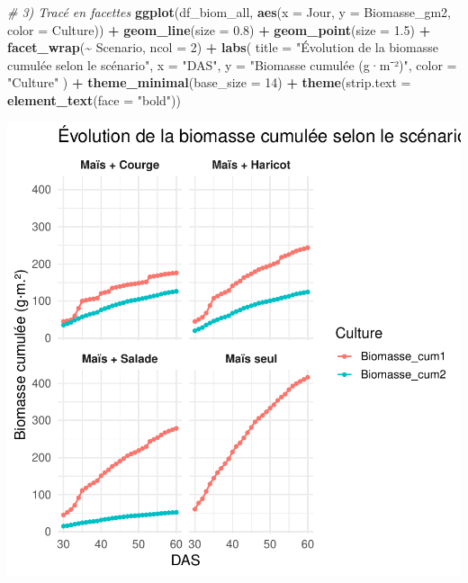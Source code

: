 \documentclass[
]{article}
\newenvironment{Shaded}{\begin{snugshade}}{\end{snugshade}}
\newcommand{\AttributeTok}[1]{\textcolor[rgb]{0.13,0.29,0.53}{#1}}
\newcommand{\CommentTok}[1]{\textcolor[rgb]{0.56,0.35,0.01}{\textit{#1}}}
\newcommand{\DecValTok}[1]{\textcolor[rgb]{0.00,0.00,0.81}{#1}}
\newcommand{\FloatTok}[1]{\textcolor[rgb]{0.00,0.00,0.81}{#1}}
\newcommand{\FunctionTok}[1]{\textcolor[rgb]{0.13,0.29,0.53}{\textbf{#1}}}
\newcommand{\NormalTok}[1]{#1}
\newcommand{\SpecialCharTok}[1]{\textcolor[rgb]{0.81,0.36,0.00}{\textbf{#1}}}
\newcommand{\StringTok}[1]{\textcolor[rgb]{0.31,0.60,0.02}{#1}}
\begin{document}
\begin{Shaded}
\begin{Highlighting}[]
\CommentTok{\# 3) Tracé en facettes}
\FunctionTok{ggplot}\NormalTok{(df\_biom\_all, }\FunctionTok{aes}\NormalTok{(}\AttributeTok{x =}\NormalTok{ Jour, }\AttributeTok{y =}\NormalTok{ Biomasse\_gm2, }\AttributeTok{color =}\NormalTok{ Culture)) }\SpecialCharTok{+}
  \FunctionTok{geom\_line}\NormalTok{(}\AttributeTok{size =} \FloatTok{0.8}\NormalTok{) }\SpecialCharTok{+}
  \FunctionTok{geom\_point}\NormalTok{(}\AttributeTok{size =} \FloatTok{1.5}\NormalTok{) }\SpecialCharTok{+}
  \FunctionTok{facet\_wrap}\NormalTok{(}\SpecialCharTok{\textasciitilde{}}\NormalTok{ Scenario, }\AttributeTok{ncol =} \DecValTok{2}\NormalTok{) }\SpecialCharTok{+}
  \FunctionTok{labs}\NormalTok{(}
    \AttributeTok{title =} \StringTok{"Évolution de la biomasse cumulée selon le scénario"}\NormalTok{,}
    \AttributeTok{x     =} \StringTok{"DAS"}\NormalTok{,}
    \AttributeTok{y     =} \StringTok{"Biomasse cumulée (g·m⁻²)"}\NormalTok{,}
    \AttributeTok{color =} \StringTok{"Culture"}
\NormalTok{  ) }\SpecialCharTok{+}
  \FunctionTok{theme\_minimal}\NormalTok{(}\AttributeTok{base\_size =} \DecValTok{14}\NormalTok{) }\SpecialCharTok{+}
  \FunctionTok{theme}\NormalTok{(}\AttributeTok{strip.text =} \FunctionTok{element\_text}\NormalTok{(}\AttributeTok{face =} \StringTok{"bold"}\NormalTok{))}
\end{Highlighting}
\end{Shaded}

\begin{center}\includegraphics[width=0.7\linewidth]{Rapport_final_Maxime_CORNEZ_files/figure-latex/graphe-biomasse-1} \end{center}
\end{document}

